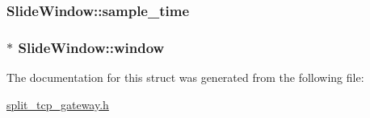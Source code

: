 \hypertarget{structSlideWindow_ac6ddc4f86ffd3dc624ca0b710c9701d0}{
\subsubsection[{sample\-\_\-time}]{ {\bf \-Slide\-Window\-::sample\-\_\-time}}}\label{structSlideWindow_ac6ddc4f86ffd3dc624ca0b710c9701d0}
\hypertarget{structSlideWindow_ac2d24fae7063beaab8681575f9a455f3}{
\subsubsection[{window}]{$\ast$ {\bf \-Slide\-Window\-::window}}}\label{structSlideWindow_ac2d24fae7063beaab8681575f9a455f3}


\-The documentation for this struct was generated from the following file\-:\begin{DoxyCompactItemize}
\item 
\hyperlink{split__tcp__gateway_8h}{split\-\_\-tcp\-\_\-gateway.\-h}\end{DoxyCompactItemize}
